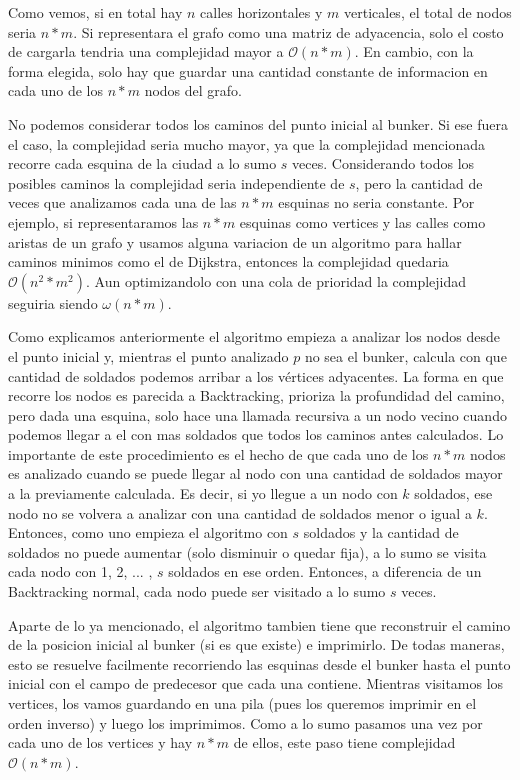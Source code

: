 \medskip

Como vemos, si en total hay $n$ calles horizontales y $m$ verticales, el total de nodos seria $n*m$. Si representara el grafo como una matriz de adyacencia, solo el costo de cargarla tendria una complejidad mayor a $\mathcal{O}(n*m)$. En cambio, con la forma elegida, solo hay que guardar una cantidad constante de informacion en cada uno de los $n*m$ nodos del grafo.

No podemos considerar todos los caminos del punto inicial al bunker. Si ese fuera el caso, la complejidad seria mucho mayor, ya que la complejidad mencionada recorre cada esquina de la ciudad a lo sumo $s$ veces. Considerando todos los posibles caminos la complejidad seria independiente de $s$, pero la cantidad de veces que analizamos cada una de las $n*m$ esquinas no seria constante. Por ejemplo, si representaramos las $n*m$ esquinas como vertices y las calles como aristas de un grafo y usamos alguna variacion de un algoritmo para hallar caminos minimos como el de Dijkstra, entonces la complejidad quedaria $\mathcal{O}(n^2*m^2)$. Aun optimizandolo con una cola de prioridad la complejidad seguiria siendo $\omega(n*m)$.

Como explicamos anteriormente el algoritmo empieza a analizar los nodos desde el punto inicial y, mientras el punto analizado $p$ no sea el bunker, calcula con que cantidad de soldados podemos arribar a los vértices adyacentes. La forma en que recorre los nodos es parecida a Backtracking, prioriza la profundidad del camino, pero dada una esquina, solo hace una llamada recursiva a un nodo vecino cuando podemos llegar a el con mas soldados que todos los caminos antes calculados.
Lo importante de este procedimiento es el hecho de que cada uno de los $n*m$ nodos es analizado cuando se puede llegar al nodo con una cantidad de soldados mayor a la previamente calculada. Es decir, si yo llegue a un nodo con $k$ soldados, ese nodo no se volvera a analizar con una cantidad de soldados menor o igual a $k$. Entonces, como uno empieza el algoritmo con $s$ soldados y la cantidad de soldados no puede aumentar (solo disminuir o quedar fija), a lo sumo se visita cada nodo con 1, 2, ... , $s$ soldados en ese orden. Entonces, a diferencia de un Backtracking normal, cada nodo puede ser visitado a lo sumo $s$ veces.

Aparte de lo ya mencionado, el algoritmo tambien tiene que reconstruir el camino de la posicion inicial al bunker (si es que existe) e imprimirlo. De todas maneras, esto se resuelve facilmente recorriendo las esquinas desde el bunker hasta el punto inicial con el campo de predecesor que cada una contiene. Mientras visitamos los vertices, los vamos guardando en una pila (pues los queremos imprimir en el orden inverso) y luego los imprimimos. Como a lo sumo pasamos una vez por cada uno de los vertices y hay $n*m$ de ellos, este paso tiene complejidad $\mathcal{O}(n*m)$.

